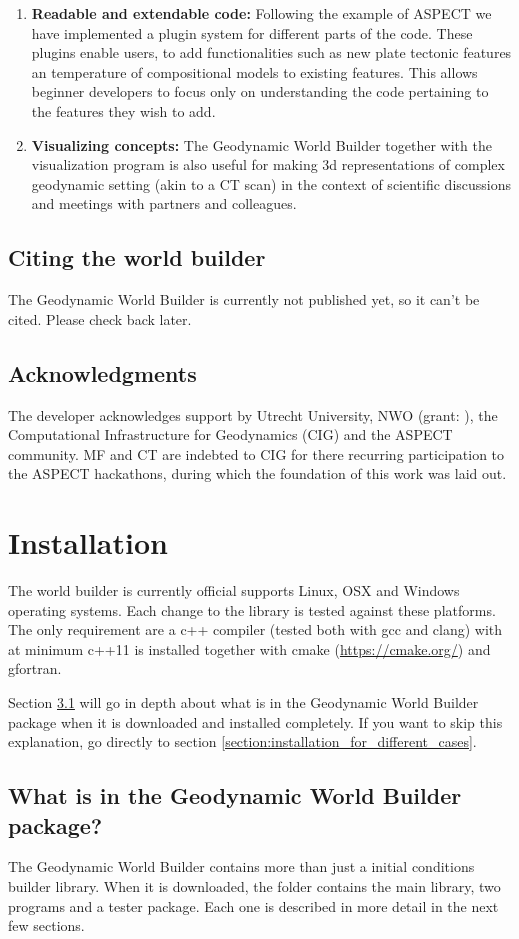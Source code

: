 \documentclass{book}
\newcommand{\GWB}{{Geodynamic World Builder}}
\newcommand{\aspect}{{ASPECT}}
\newcommand{\cmake}{{cmake}}
\begin{document}
\begin{enumerate}
    \item {\bf Readable and extendable code:} Following the example of \aspect{} we have implemented a plugin system for different parts of the code. These plugins enable users, to add functionalities such as new plate tectonic features an temperature of compositional models to existing features. This allows beginner developers to focus only on understanding the code pertaining to the features they wish to add. 
    
    \item {\bf Visualizing concepts:} The \GWB{} together with the visualization program is also useful for making 3d representations of complex geodynamic setting (akin to a CT scan) in the context of scientific discussions and meetings with partners and colleagues. 
\end{enumerate}

\section{Citing the world builder}
The \GWB{} is currently not published yet, so it can't be cited. Please check back later.
\section{Acknowledgments}
The developer acknowledges support by Utrecht University, NWO (grant: ), the Computational Infrastructure for Geodynamics (CIG) and the ASPECT community. MF and CT are indebted to CIG for there recurring participation to the ASPECT hackathons, during which the foundation of this work was laid out.


\chapter{Installation}
\label{chapter:installation}
The world builder is currently official supports Linux, OSX and Windows operating systems. Each change to the library is tested against these platforms. The only requirement are a c++ compiler (tested both with gcc and clang) with at minimum c++11 is installed together with \cmake{} (\url{https://cmake.org/}) and gfortran. 

Section \ref{section:in_package} will go in depth about what is in the \GWB{} package when it is downloaded and installed completely. If you want to skip this explanation, go directly to section \ref{section:installation_for_different_cases}.


\section{What is in the \GWB{} package?}
\label{section:in_package}
The \GWB{} contains more than just a initial conditions builder library. When it is downloaded, the folder contains the main library, two programs and a tester package. Each one is described in more detail in the next few sections.
\end{document}
